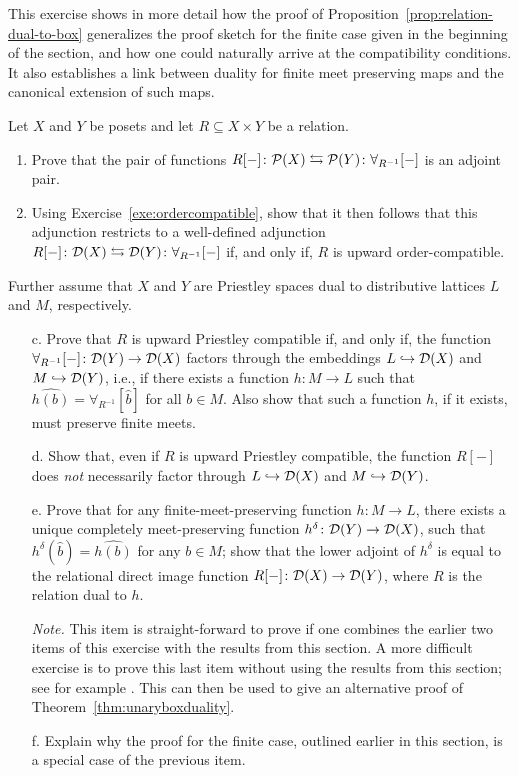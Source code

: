 \begin{exercise}\label{exe:box-duality-viacanext}
This exercise shows in more detail how the proof of Proposition~\ref{prop:relation-dual-to-box} generalizes the proof sketch for the finite case given in the beginning of the section, and how one could naturally arrive at the compatibility conditions. It also establishes a link between duality for finite meet preserving maps and the canonical extension of such maps. 

Let $X$ and $Y$ be posets and let $R \subseteq X \times Y$ be a relation.
\begin{enumerate}
	\item  Prove that the pair of functions $R[-] \colon \mathcal{P}(X) \leftrightarrows \mathcal{P}(Y) \colon \forall_{R^{-1}}[-]$ is an adjoint pair.
	\item Using Exercise~\ref{exe:ordercompatible}, show that it then follows that this adjunction restricts to a well-defined adjunction  $R[-] \colon \mathcal{D}(X) \leftrightarrows \mathcal{D}(Y) \colon \forall_{R^{-1}}[-]$ if, and only if, $R$ is upward order-compatible.
\end{enumerate}

Further assume that $X$ and $Y$ are Priestley spaces dual to distributive lattices $L$ and $M$, respectively. 
\begin{enumerate}
	\item[c.] 
	Prove that $R$ is upward Priestley compatible if, and only if, the function $\forall_{R^{-1}}[-] \colon \mathcal{D}(Y) \to \mathcal{D}(X)$ factors through the embeddings $L \hookrightarrow \mathcal{D}(X)$ and $M \hookrightarrow \mathcal{D}(Y)$, i.e., if there exists a function $h \colon M \to L$ such that $\widehat{h(b)} = \forall_{R^{-1}}[\widehat{b}]$ for all $b \in M$. Also show that such a function $h$, if it exists, must preserve finite meets.
	\item[d.] Show that, even if $R$ is upward Priestley compatible, the function $R[-]$ does \emph{not} necessarily factor through $L \hookrightarrow \mathcal{D}(X)$ and $M \hookrightarrow \mathcal{D}(Y)$.
	\item[e.] Prove that for any finite-meet-preserving function $h \colon M \to L$, there exists a unique completely meet-preserving function $h^\delta \colon \mathcal{D}(Y) \to \mathcal{D}(X)$, such that $h^\delta(\widehat{b}) = \widehat{h(b)}$ for any $b \in M$; show that the lower adjoint of $h^\delta$ is equal to the relational direct image function $R[-] \colon \mathcal{D}(X) \to \mathcal{D}(Y)$, where $R$ is the relation dual to $h$.
	
	{\it Note.} This item is straight-forward to prove if one combines the earlier two items of this exercise with the results from this section. A more difficult exercise is to prove this last item without using the results from this section; see for example \cite{GehJon1994}. This can then be used to give an alternative proof of Theorem~\ref{thm:unaryboxduality}.
	\item[f.] Explain why the proof for the finite case, outlined earlier in this section, is a special case of the previous item.
\end{enumerate}
\end{exercise}
